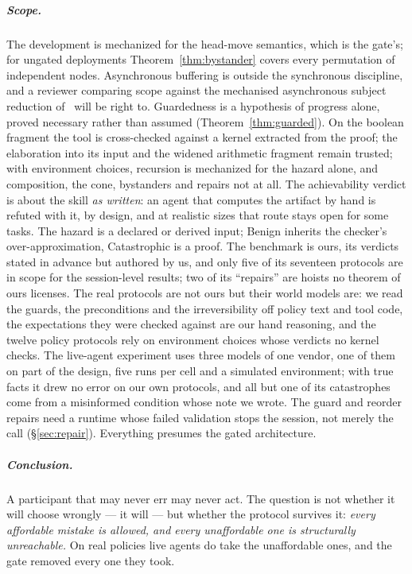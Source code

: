 \documentclass[a4paper,UKenglish,cleveref,autoref,thm-restate,anonymous]{lipics-v2021}
\newcommand{\Ben}{\textsf{Benign}}
\newcommand{\Cat}{\textsf{Catastrophic}}
\begin{document}
\subparagraph*{Scope.} The development is mechanized for the head-move
semantics, which is the gate's; for ungated deployments
Theorem~\ref{thm:bystander} covers every permutation of independent nodes.
Asynchronous buffering is outside the synchronous discipline, and a reviewer
comparing scope against the mechanised asynchronous subject reduction
of~\cite{tirore-ecoop25} will be right to. Guardedness is a hypothesis of
progress alone, proved necessary rather than assumed
(Theorem~\ref{thm:guarded}). On the boolean fragment the tool is cross-checked
against a kernel extracted from the proof; the elaboration into its input
and the widened arithmetic fragment remain trusted; with environment choices,
recursion is mechanized for the hazard alone, and composition, the cone,
bystanders and repairs not at all. The
achievability verdict is about the skill \emph{as written}: an agent that
computes the artifact by hand is refuted with it, by design, and at realistic
sizes that route stays open for some tasks. The hazard is a declared or derived
input; \Ben{} inherits the checker's over-approximation, \Cat{} is a proof.
The benchmark is ours, its verdicts stated in advance but authored by us, and
only five of its seventeen protocols are in scope for the session-level
results; two of its ``repairs'' are hoists no theorem of ours licenses. The
real protocols are not ours but their world models are: we read the guards, the
preconditions and the irreversibility off policy text and tool code, the
expectations they were checked against are our hand reasoning, and the twelve
policy protocols rely on environment choices whose verdicts no kernel checks.
The live-agent experiment uses three models of one vendor, one of them on part of the design, five runs per cell and
a simulated environment; with true facts it drew no error on our own protocols,
and all but one of its catastrophes come from a misinformed condition whose note we wrote. The guard and reorder repairs need a runtime whose failed
validation stops the session, not merely the call (\S\ref{sec:repair}).
Everything presumes the gated architecture.

\subparagraph*{Conclusion.} A participant that may never err may never act. The
question is not whether it will choose wrongly --- it will --- but whether the
protocol survives it: \emph{every affordable mistake is allowed, and every
unaffordable one is structurally unreachable.} On real policies live agents do
take the unaffordable ones, and the gate removed every one they took.



\end{document}
